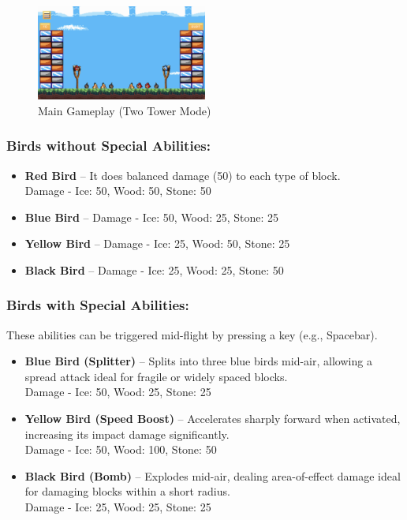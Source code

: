 \documentclass[10pt]{article}
\begin{document}
\begin{figure}[H]
    \centering
    \includegraphics[width=0.5\textwidth]{game.png}
    \caption{Main Gameplay (Two Tower Mode)}
\end{figure}

\subsubsection*{Birds without Special Abilities:}
\begin{itemize}
    \item \textbf{Red Bird} – It does balanced damage (50) to each type of block. \\ Damage - Ice: 50, Wood: 50, Stone: 50
    \item \textbf{Blue Bird} – Damage - Ice: 50, Wood: 25, Stone: 25
    \item \textbf{Yellow Bird} – Damage - Ice: 25, Wood: 50, Stone: 25
    \item \textbf{Black Bird} – Damage - Ice: 25, Wood: 25, Stone: 50
\end{itemize}

\subsubsection*{Birds with Special Abilities:}
These abilities can be triggered mid-flight by pressing a key (e.g., Spacebar).
\begin{itemize}
    \item \textbf{Blue Bird (Splitter)} – Splits into three blue birds mid-air, allowing a spread attack ideal for fragile or widely spaced blocks. \\ Damage - Ice: 50, Wood: 25, Stone: 25
    \item \textbf{Yellow Bird (Speed Boost)} – Accelerates sharply forward when activated, increasing its impact damage significantly. \\ Damage - Ice: 50, Wood: 100, Stone: 50
    \item \textbf{Black Bird (Bomb)} – Explodes mid-air, dealing area-of-effect damage ideal for damaging blocks within a short radius. \\ Damage - Ice: 25, Wood: 25, Stone: 25
\end{itemize}
\end{document}
